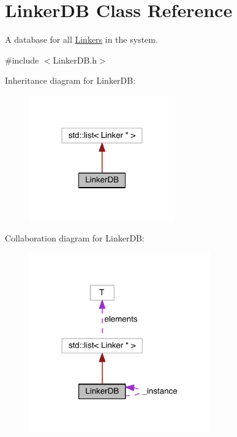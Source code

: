 \hypertarget{classLinkerDB}{\section{Linker\+D\+B Class Reference}
\label{classLinkerDB}
}


A database for all \hyperlink{classLinker}{Linkers} in the system.  




{\ttfamily \#include $<$Linker\+D\+B.\+h$>$}



Inheritance diagram for Linker\+D\+B\+:\nopagebreak
\begin{figure}[H]
\begin{center}
\leavevmode
\includegraphics[width=178pt]{classLinkerDB__inherit__graph}
\end{center}
\end{figure}


Collaboration diagram for Linker\+D\+B\+:\nopagebreak
\begin{figure}[H]
\begin{center}
\leavevmode
\includegraphics[width=221pt]{classLinkerDB__coll__graph}
\end{center}
\end{figure}
